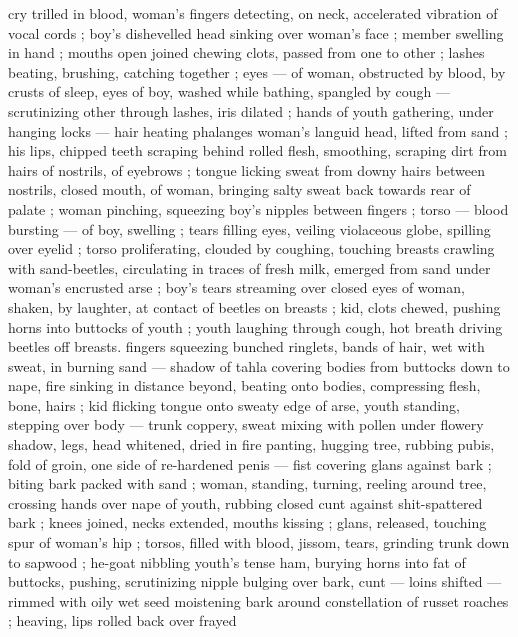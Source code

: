 cry trilled in blood, woman's fingers detecting, on neck, accelerated 
vibration of vocal cords ; boy's dishevelled head sinking over 
woman's face ; member swelling in hand ; mouths open joined 
chewing clots, passed from one to other ; lashes beating, brushing, 
catching together ; eyes --- of woman, obstructed by blood, by 
crusts of sleep, eyes of boy, washed while bathing, spangled by 
cough --- scrutinizing other through lashes, iris dilated ; hands of 
youth gathering, under hanging locks --- hair heating phalanges {\dashcom}
woman's languid head, lifted from sand ; his lips, chipped teeth 
scraping behind rolled flesh, smoothing, scraping dirt from hairs of 
nostrils, of eyebrows ; tongue licking sweat from downy hairs 
between nostrils, closed mouth, of woman, bringing salty sweat back 
towards rear of palate ; woman pinching, squeezing boy's nipples 
between fingers ; torso --- blood bursting --- of boy, swelling ; tears 
filling eyes, veiling violaceous globe, spilling over eyelid ; torso 
proliferating, clouded by coughing, touching breasts crawling with 
sand-beetles, circulating in traces of fresh milk, emerged from sand 
under woman's encrusted arse ; boy's tears streaming over closed 
eyes of woman, shaken, by laughter, at contact of beetles on breasts 
; kid, clots chewed, pushing horns into buttocks of youth ; youth 
laughing through cough, hot breath driving beetles off breasts. 
fingers squeezing bunched ringlets, bands of hair, wet with sweat, in 
burning sand --- shadow of tahla covering bodies from buttocks 
down to nape, fire sinking in distance beyond, beating onto bodies, 
compressing flesh, bone, hairs ; kid flicking tongue onto sweaty edge 
of arse, youth standing, stepping over body --- trunk coppery, sweat 
mixing with pollen under flowery shadow, legs, head whitened, dried 
in fire {\dashcol} panting, hugging tree, rubbing pubis, fold of groin, one 
side of re-hardened penis --- fist covering glans {\dashcol} against bark ; 
biting bark packed with sand ; woman, standing, turning, reeling 
around tree, crossing hands over nape of youth, rubbing closed cunt 
against shit-spattered bark ; knees joined, necks extended, mouths 
kissing ; glans, released, touching spur of woman's hip ; torsos, filled 
with blood, jissom, tears, grinding trunk down to sapwood ; he-goat 
nibbling youth's tense ham, burying horns into fat of buttocks, 
pushing, scrutinizing  nipple bulging over bark, cunt --- loins 
shifted --- rimmed with oily wet seed moistening bark around 
constellation of russet roaches ; heaving, lips rolled back over frayed 
